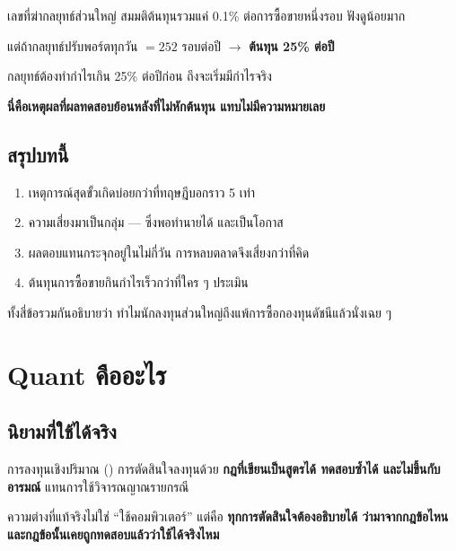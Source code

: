 \documentclass[11pt]{article}
\begin{document}
\begin{trap}{เลขที่ฆ่ากลยุทธ์ส่วนใหญ่}
สมมติต้นทุนรวมแค่ 0.1\% ต่อการซื้อขายหนึ่งรอบ ฟังดูน้อยมาก

แต่ถ้ากลยุทธ์ปรับพอร์ตทุกวัน $= 252$ รอบต่อปี
$\rightarrow$ \textbf{ต้นทุน 25\% ต่อปี}

กลยุทธ์ต้องทำกำไรเกิน 25\% ต่อปีก่อน ถึงจะเริ่มมีกำไรจริง

\textbf{นี่คือเหตุผลที่ผลทดสอบย้อนหลังที่ไม่หักต้นทุน แทบไม่มีความหมายเลย}
\end{trap}

\subsection{สรุปบทนี้}

\begin{keypoint}
\begin{enumerate}
\item เหตุการณ์สุดขั้วเกิดบ่อยกว่าที่ทฤษฎีบอกราว 5 เท่า
\item ความเสี่ยงมาเป็นกลุ่ม --- ซึ่งพอทำนายได้ และเป็นโอกาส
\item ผลตอบแทนกระจุกอยู่ในไม่กี่วัน การหลบตลาดจึงเสี่ยงกว่าที่คิด
\item ต้นทุนการซื้อขายกินกำไรเร็วกว่าที่ใคร ๆ ประเมิน
\end{enumerate}

ทั้งสี่ข้อรวมกันอธิบายว่า ทำไมนักลงทุนส่วนใหญ่ถึงแพ้การซื้อกองทุนดัชนีแล้วนั่งเฉย ๆ
\end{keypoint}

\section{Quant คืออะไร}

\subsection{นิยามที่ใช้ได้จริง}

\begin{term}{การลงทุนเชิงปริมาณ ()}
การตัดสินใจลงทุนด้วย \textbf{กฎที่เขียนเป็นสูตรได้ ทดสอบซ้ำได้ และไม่ขึ้นกับอารมณ์}
แทนการใช้วิจารณญาณรายกรณี

ความต่างที่แท้จริงไม่ใช่ ``ใช้คอมพิวเตอร์'' แต่คือ \textbf{ทุกการตัดสินใจต้องอธิบายได้
ว่ามาจากกฎข้อไหน และกฎข้อนั้นเคยถูกทดสอบแล้วว่าใช้ได้จริงไหม}
\end{term}
\end{document}
